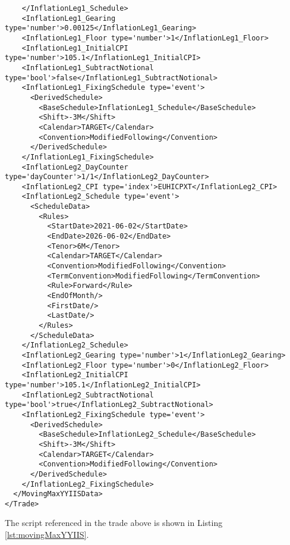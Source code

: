 \begin{verbatim}
    </InflationLeg1_Schedule>
    <InflationLeg1_Gearing type='number'>0.00125</InflationLeg1_Gearing>
    <InflationLeg1_Floor type='number'>1</InflationLeg1_Floor>
    <InflationLeg1_InitialCPI type='number'>105.1</InflationLeg1_InitialCPI>
    <InflationLeg1_SubtractNotional type='bool'>false</InflationLeg1_SubtractNotional>
    <InflationLeg1_FixingSchedule type='event'>
      <DerivedSchedule>
        <BaseSchedule>InflationLeg1_Schedule</BaseSchedule>
        <Shift>-3M</Shift>
        <Calendar>TARGET</Calendar>
        <Convention>ModifiedFollowing</Convention>
      </DerivedSchedule>
    </InflationLeg1_FixingSchedule>
    <InflationLeg2_DayCounter type='dayCounter'>1/1</InflationLeg2_DayCounter>
    <InflationLeg2_CPI type='index'>EUHICPXT</InflationLeg2_CPI>
    <InflationLeg2_Schedule type='event'>
      <ScheduleData>
        <Rules>
          <StartDate>2021-06-02</StartDate>
          <EndDate>2026-06-02</EndDate>
          <Tenor>6M</Tenor>
          <Calendar>TARGET</Calendar>
          <Convention>ModifiedFollowing</Convention>
          <TermConvention>ModifiedFollowing</TermConvention>
          <Rule>Forward</Rule>
          <EndOfMonth/>
          <FirstDate/>
          <LastDate/>
        </Rules>
      </ScheduleData>
    </InflationLeg2_Schedule>
    <InflationLeg2_Gearing type='number'>1</InflationLeg2_Gearing>
    <InflationLeg2_Floor type='number'>0</InflationLeg2_Floor>
    <InflationLeg2_InitialCPI type='number'>105.1</InflationLeg2_InitialCPI>
    <InflationLeg2_SubtractNotional type='bool'>true</InflationLeg2_SubtractNotional>
    <InflationLeg2_FixingSchedule type='event'>
      <DerivedSchedule>
        <BaseSchedule>InflationLeg2_Schedule</BaseSchedule>
        <Shift>-3M</Shift>
        <Calendar>TARGET</Calendar>
        <Convention>ModifiedFollowing</Convention>
      </DerivedSchedule>
    </InflationLeg2_FixingSchedule>
  </MovingMaxYYIISData>
</Trade>
\end{verbatim}

The script referenced in the trade above is shown in Listing \ref{lst:movingMaxYYIIS}.

